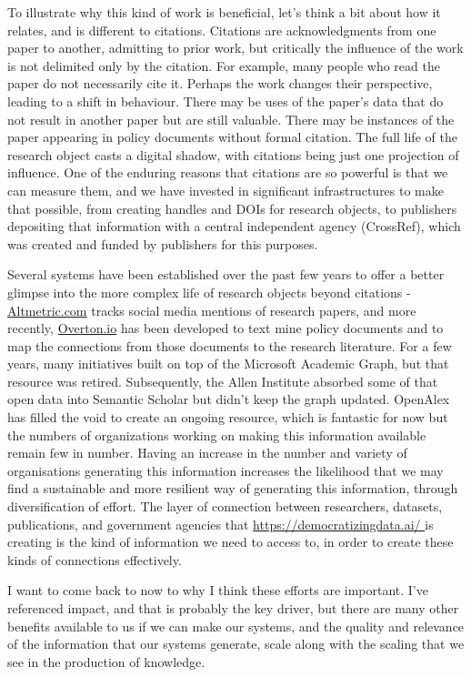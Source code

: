 \documentclass[]{hdsr}
\begin{document}
To illustrate why this kind of work is beneficial, let's think a bit about how it relates, and is different to citations. Citations are acknowledgments from one paper to another, admitting to prior work, but critically the influence of the work is not delimited only by the citation. For example, many people who read the paper do not necessarily cite it. Perhaps the work changes their perspective, leading to a shift in behaviour. There may be uses of the paper's data that do not result in another paper but are still valuable. There may be instances of the paper appearing in policy documents without formal citation. The full life of the research object casts a digital shadow, with citations being just one projection of influence. One of the enduring reasons that citations are so powerful is that we can measure them, and we have invested in significant infrastructures to make that possible, from creating handles and DOIs for research objects, to publishers depositing that information with a central independent agency (CrossRef), which was created and funded by publishers for this purposes.

Several systems have been established over the past few years to offer a better glimpse into the more complex life of research objects beyond citations - \href{Altmetric.com}{Altmetric.com} tracks social media mentions of research papers, and more recently, \href{https://www.Overton.io}{Overton.io} has been developed to text mine policy documents and to map the connections from those documents to the research literature. For a few years, many initiatives built on top of the Microsoft Academic Graph, but that resource was retired. Subsequently, the Allen Institute absorbed some of that open data into Semantic Scholar but didn't keep the graph updated. OpenAlex has filled the void to create an ongoing resource, which is fantastic for now but the numbers of organizations working on making this information available remain few in number. Having an increase in the number and variety of organisations generating this information increases the likelihood that we may find a sustainable and more resilient way of generating this information, through diversification of effort. The layer of connection between researchers, datasets, publications, and government agencies that \href{https://democratizingdata.ai/}{https://democratizingdata.ai/ }is creating is the kind of information we need to access to, in order to create these kinds of connections effectively.

I want to come back to now to why I think these efforts are important. I’ve referenced impact, and that is probably the key driver, but there are many other benefits available to us if we can make our systems, and the quality and relevance of the information that our systems generate, scale along with the scaling that we see in the production of knowledge.
\end{document}
